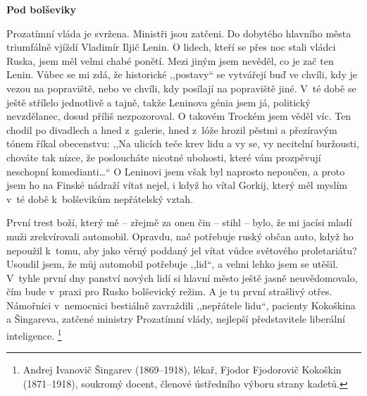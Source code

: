 \bigskip

\noindent
\textbf{Pod bolševiky }

\noindent
Prozatímní vláda je svržena. Ministři jsou zatčeni. Do dobytého hlavního města triumfálně vjíždí Vladimír Iljič Lenin. O lidech, kteří se přes noc stali vládci Ruska, jsem měl velmi chabé ponětí. Mezi jiným jsem nevěděl, co je zač ten Lenin. Vůbec se mi zdá, že historické ,,postavy`` se vytvářejí buď ve chvíli, kdy je vezou na popraviště, nebo ve chvíli, kdy posílají na popraviště jiné. V té době se ještě střílelo jednotlivě a tajně, takže Leninova génia jsem já, politický nevzdělanec, dosud příliš nezpozoroval. O takovém Trockém jsem věděl víc. Ten chodil po divadlech a hned z galerie, hned z lóže hrozil pěstmi a přezíravým tónem říkal obecenstvu: ,,Na ulicích teče krev lidu a vy se, vy necitelní buržousti, chováte tak nízce, že posloucháte nicotné ubohosti, které vám prozpěvují neschopní komedianti\ldots`` O Leninovi jsem však byl naprosto nepoučen, a proto jsem ho na Finské nádraží vítat nejel, i když ho vítal Gorkij, který měl myslím v té době k bolševikům nepřátelský vztah. 

První trest boží, který mě -- zřejmě za onen čin -- stihl -- bylo, že mi jacísi mladí muži zrekvírovali automobil. Opravdu, nač potřebuje ruský občan auto, když ho nepoužil k tomu, aby jako věrný poddaný jel vítat vůdce světového proletariátu? Usoudil jsem, že můj automobil potřebuje ,,lid``, a velmi lehko jsem se utěšil. V tyhle první dny panství nových lidí si hlavní město ještě jasně neuvědomovalo, čím bude v praxi pro Rusko bolševický režim. A je tu první strašlivý otřes. Námořníci v nemocnici bestiálně zavraždili ,,nepřátele lidu``, pacienty Kokoškina a Šingareva, zatčené ministry Prozatímní vlády, nejlepší představitele liberální inteligence. \footnote{Andrej Ivanovič Šingarev (1869--1918), lékař, Fjodor Fjodorovič Kokoškin (1871--1918), soukromý docent, členové ústředního výboru strany kadetů.}

